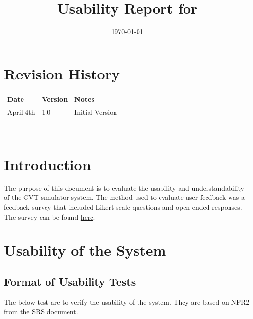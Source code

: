 \documentclass[12pt, titlepage]{article}
\begin{document}
\title{Usability Report for \progname{}} 
\author{\authname}
\date{\today}
	
\maketitle


\section*{Revision History}

\begin{tabularx}{\textwidth}{p{3cm}p{2cm}X}
\toprule {\bf Date} & {\bf Version} & {\bf Notes}\\
\hline
April 4th & 1.0 & Initial Version\\
\midrule

\bottomrule
\end{tabularx}

~\\

\newpage

\tableofcontents



\newpage


\newpage


\section{Introduction}

The purpose of this document is to evaluate the usability and understandability of the CVT simulator system. The method used to evaluate user feedback was a feedback survey that included Likert-scale questions and open-ended responses.
The survey can be found \href{https://forms.office.com/r/RkeDW31ZTS}{here}. 

\section{Usability of the System}

\subsection{Format of Usability Tests}

The below test are to verify the usability of the system.
They are based on NFR2 from the \href{https://github.com/gr812b/CVT-Simulator/blob/main/docs/SRS/SRS.pdf}{SRS document}.
\end{document}
